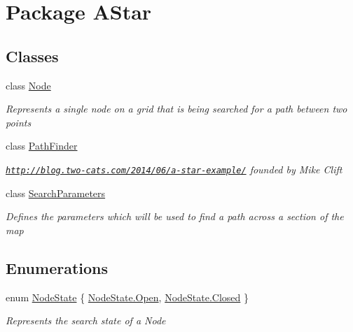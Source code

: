 \hypertarget{namespaceAStar}{\section{Package A\-Star}
\label{namespaceAStar}
}
\subsection*{Classes}
\begin{DoxyCompactItemize}
\item 
class \hyperlink{classAStar_1_1Node}{Node}
\begin{DoxyCompactList}\small\item\em Represents a single node on a grid that is being searched for a path between two points \end{DoxyCompactList}\item 
class \hyperlink{classAStar_1_1PathFinder}{Path\-Finder}
\begin{DoxyCompactList}\small\item\em \href{http://blog.two-cats.com/2014/06/a-star-example/}{\tt http\-://blog.\-two-\/cats.\-com/2014/06/a-\/star-\/example/} founded by Mike Clift \end{DoxyCompactList}\item 
class \hyperlink{classAStar_1_1SearchParameters}{Search\-Parameters}
\begin{DoxyCompactList}\small\item\em Defines the parameters which will be used to find a path across a section of the map \end{DoxyCompactList}\end{DoxyCompactItemize}
\subsection*{Enumerations}
\begin{DoxyCompactItemize}
\item 
enum \hyperlink{namespaceAStar_a44d96e2d4066e21483fa07d62358c358}{Node\-State} \{ \hyperlink{namespaceAStar_a44d96e2d4066e21483fa07d62358c358ac3bf447eabe632720a3aa1a7ce401274}{Node\-State.\-Open}, 
\hyperlink{namespaceAStar_a44d96e2d4066e21483fa07d62358c358a03f4a47830f97377a35321051685071e}{Node\-State.\-Closed}
 \}
\begin{DoxyCompactList}\small\item\em Represents the search state of a Node \end{DoxyCompactList}\end{DoxyCompactItemize}


